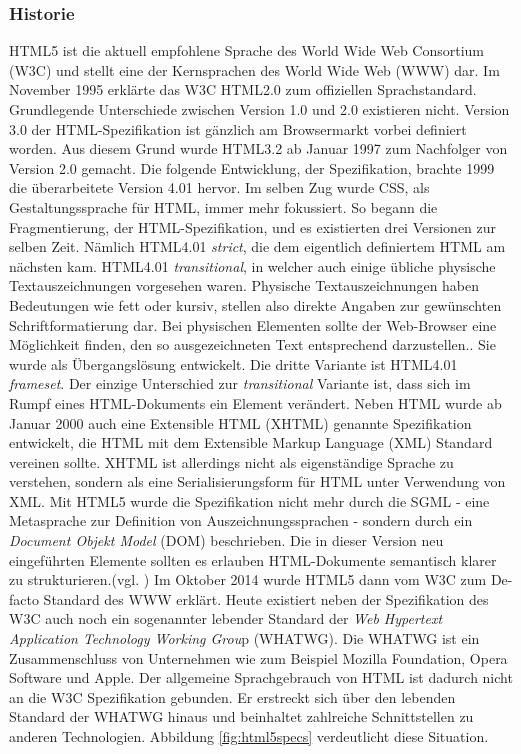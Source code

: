 \subsubsection{Historie} HTML5 ist die aktuell empfohlene Sprache des World Wide Web Consortium (W3C) und stellt eine der Kernsprachen des World Wide Web (WWW) dar. Im November 1995 erklärte das W3C HTML2.0 zum offiziellen Sprachstandard. Grundlegende Unterschiede zwischen Version 1.0 und 2.0 existieren nicht. Version 3.0 der HTML-Spezifikation ist gänzlich am Browsermarkt vorbei definiert worden. Aus diesem Grund wurde HTML3.2 ab Januar 1997 zum Nachfolger von Version 2.0 gemacht. Die folgende Entwicklung, der Spezifikation, brachte 1999 die überarbeitete Version 4.01 hervor. Im selben Zug wurde CSS, als Gestaltungssprache für HTML, immer mehr fokussiert. So begann die Fragmentierung, der HTML-Spezifikation, und es existierten drei Versionen zur selben Zeit. Nämlich HTML4.01 \textit{strict}, die dem eigentlich definiertem HTML am nächsten kam. HTML4.01 \textit{transitional}, in welcher auch einige übliche physische Textauszeichnungen vorgesehen waren. \glqq Physische Textauszeichnungen haben Bedeutungen wie \glqq fett\grqq{} oder \glqq kursiv\grqq{}, stellen also direkte Angaben zur gewünschten Schriftformatierung dar. Bei physischen Elementen sollte der Web-Browser eine Möglichkeit finden, den so ausgezeichneten Text entsprechend darzustellen.\grqq{}\cite{SelfHTML20141}. Sie wurde als Übergangslösung entwickelt. Die dritte Variante ist HTML4.01 \textit{frameset}. Der einzige Unterschied zur \textit{transitional} Variante ist, dass sich im Rumpf eines HTML-Dokuments ein Element verändert. Neben HTML wurde ab Januar 2000 auch eine Extensible HTML (XHTML) genannte Spezifikation entwickelt, die HTML mit dem Extensible Markup Language (XML) Standard vereinen sollte. XHTML ist allerdings nicht als eigenständige Sprache zu verstehen, sondern als eine Serialisierungsform für HTML unter Verwendung von XML. Mit HTML5 wurde die Spezifikation nicht mehr durch die SGML - eine Metasprache zur Definition von Auszeichnungssprachen - sondern durch ein \textit{Document Objekt Model} (DOM) beschrieben. Die in dieser Version neu eingeführten Elemente sollten es erlauben HTML-Dokumente semantisch klarer zu strukturieren.(vgl. \cite[S.20ff]{MunzHTML2012}) Im Oktober 2014 wurde HTML5 dann vom W3C zum De-facto Standard des WWW erklärt. Heute existiert neben der Spezifikation des W3C auch noch ein sogenannter \glqq lebender Standard\grqq{} der \textit{Web Hypertext Application Technology Working Grou}p (WHATWG). Die WHATWG ist ein Zusammenschluss von Unternehmen wie zum Beispiel Mozilla Foundation, Opera Software und Apple. Der allgemeine Sprachgebrauch von HTML ist dadurch nicht an die W3C Spezifikation gebunden. Er erstreckt sich über den \glqq lebenden Standard\grqq{} der WHATWG hinaus und beinhaltet zahlreiche Schnittstellen zu anderen Technologien. Abbildung \ref{fig:html5specs} verdeutlicht diese Situation.
	
